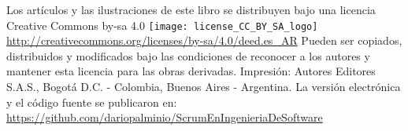 
\vspace{1cm} %
\hspace{1cm}\newline %

\begin{center}
Los artículos y las ilustraciones de este libro se 
distribuyen bajo una licencia Creative Commons by-sa 4.0 
\newline
\texttt{[image: license\_CC\_BY\_SA\_logo]}
{\small 
\url{http://creativecommons.org/licenses/by-sa/4.0/deed.es_AR}
}
\newline
Pueden ser copiados, distribuidos y modificados bajo las condiciones 
de reconocer a los autores y mantener esta licencia para las obras derivadas.
\newline\newline
Impresión: Autores Editores S.A.S.,
\newline
Bogotá D.C. - Colombia, Buenos Aires - Argentina.
\newline\newline
La versión electrónica y el código fuente se publicaron en:
{\small 
\url{https://github.com/dariopalminio/ScrumEnIngenieriaDeSoftware}
}

\end{center}
